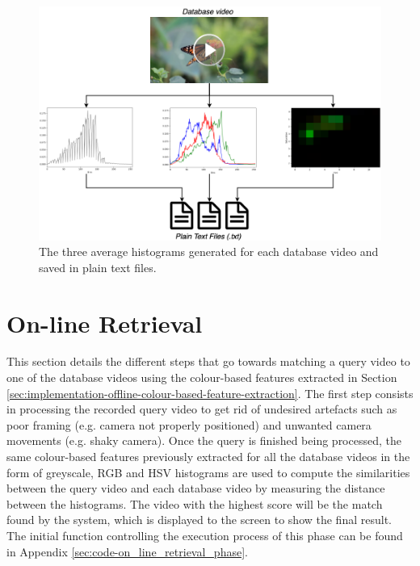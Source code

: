 \begin{figure}[h] 
\centerline{\includegraphics[width=\textwidth]{figures/implementation/all_avg_norm_histograms.png}}
\caption{\label{fig:implementation-all_avg_norm_histograms}The three average histograms generated for each database video and saved in plain text files.}
\end{figure}


\section{On-line Retrieval}

This section details the different steps that go towards matching a query video to one of the database videos using the colour-based features extracted in Section \ref{sec:implementation-offline-colour-based-feature-extraction}. The first step consists in processing the recorded query video to get rid of undesired artefacts such as poor framing (e.g. camera not properly positioned) and unwanted camera movements (e.g. shaky camera). Once the query is finished being processed, the same colour-based features previously extracted for all the database videos in the form of greyscale, RGB and HSV histograms are used to compute the similarities between the query video and each database video by measuring the distance between the histograms. The video with the highest score will be the match found by the system, which is displayed to the screen to show the final result. The initial function controlling the execution process of this phase can be found in Appendix \ref{sec:code-on_line_retrieval_phase}.

